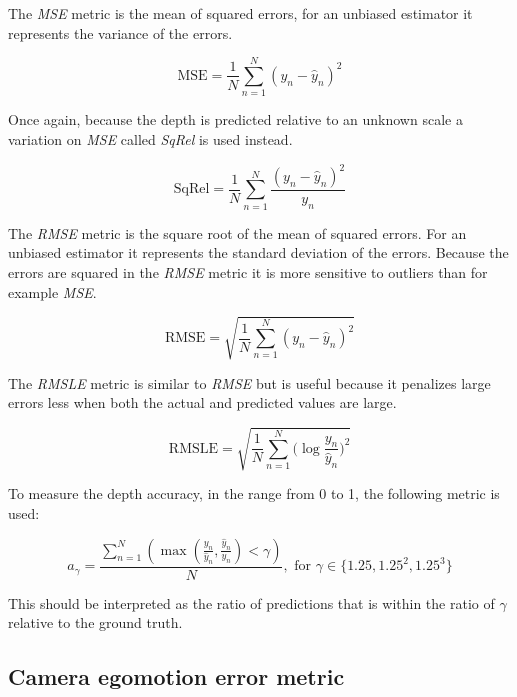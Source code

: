 The \textit{MSE} metric is the mean of squared errors, for an unbiased estimator it represents the variance of the errors. 

\begin{equation}
\textrm{MSE}=\frac{1}{N}\sum^N_{n=1}{(y_n-\hat{y}_n)^2}
\end{equation}

Once again, because the depth is predicted relative to an unknown scale a variation on \textit{MSE} called \textit{SqRel} is used instead.

\begin{equation}
\textrm{SqRel}=\frac{1}{N}\sum^N_{n=1}{\frac{(y_n-\hat{y}_n)^2}{y_n}}
\end{equation}

The \textit{RMSE} metric is the square root of the mean of squared errors. For an unbiased estimator it represents the standard deviation of the errors. Because the errors are squared in the \textit{RMSE} metric it is more sensitive to outliers than for example \textit{MSE}.

\begin{equation}
\textrm{RMSE}=\sqrt{\frac{1}{N}\sum^N_{n=1}{(y_n-\hat{y}_n)^2}}
\end{equation}

The \textit{RMSLE} metric is similar to \textit{RMSE} but is useful because it penalizes large errors less when both the actual and predicted values are large.

\begin{equation}
\textrm{RMSLE}=\sqrt{\frac{1}{N}\sum^N_{n=1}{(\log{\frac{y_n}{\hat{y}_n}}})^2}
\end{equation}

To measure the depth accuracy, in the range from 0 to 1, the following metric is used:

\begin{equation}
a_{\gamma} = \frac{\sum^N_{n=1}{(\max(\frac{y_n}{\hat{y}_n}, \frac{\hat{y}_n}{y_n}) < \gamma)}}{N},\textrm{ for }\gamma \in \{1.25, 1.25^2, 1.25^3\}
\end{equation}

This should be interpreted as the ratio of predictions that is within the ratio of $ \gamma $ relative to the ground truth.

\subsection{Camera egomotion error metric}
\label{sec:egometric}

